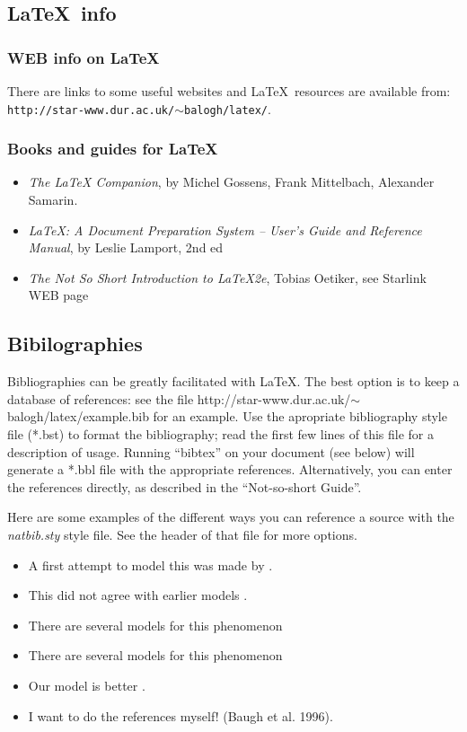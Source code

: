 \documentclass[11pt,a4paper]{emulateapj}
\begin{document}
%
%
\subsection{\LaTeX\, info}\label{sec-webrefs}
%
%
\subsubsection{WEB info on \LaTeX}
There are links to some useful websites and \LaTeX\ resources are available
from: \\ {\tt http://star-www.dur.ac.uk/$\sim$balogh/latex/}.

\subsubsection{Books and guides for \LaTeX}
\begin{itemize}
\item {\it The LaTeX Companion}, by Michel Gossens, Frank Mittelbach, Alexander Samarin.
\item {\it LaTeX: A Document Preparation System -- User's Guide and
    Reference Manual}, by Leslie Lamport, 2nd ed
\item {\it The Not So Short Introduction to LaTeX2e}, Tobias Oetiker,
  see Starlink WEB page
\end{itemize}
\subsection{Bibilographies}

Bibliographies can be greatly facilitated with \LaTeX.  The best option is to keep a database
of references: see the file http://star-www.dur.ac.uk/$\sim$balogh/latex/example.bib for an example.
Use the apropriate bibliography style file (*.bst) to format the bibliography; read the first few
lines of this file for a description of usage.  Running ``bibtex'' on your document (see below)
will generate a *.bbl file with the appropriate references.  Alternatively, you can enter the
references directly, as described in the ``Not-so-short Guide''.  

Here are some examples of the different ways you can reference a source with the
{\it natbib.sty} style file.  See the header of that file for more options.
\begin{itemize}
\item A first attempt to model this was made by \citet{bar96}.
\item This did not agree with earlier models \citep{bar96}.
\item There are several models for this phenomenon \citep{bar96,bau96}
\item There are several models for this phenomenon \citep[e.g., ][]{bar96,bau96,bure96}
\item Our model is better \citep[Fig. 5]{bau96}.
\item I want to do the references myself! (Baugh et al. 1996)\nocite{bau96}.
\end{itemize}
%
%

\end{document}
